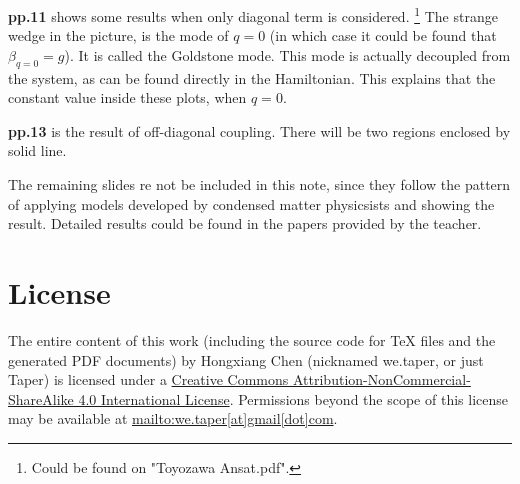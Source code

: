 \documentclass{article}
\numberwithin{equation}{subsection} %
\theoremstyle{definition}
\begin{document}
\textbf{pp.11} shows some results when only diagonal term
is considered.
\footnote{Could be found on "Toyozawa Ansat.pdf".}
The strange wedge
in the picture, is the mode of $q=0$ 
(in which case it could be found that $\beta_{q=0} = g$). 
It is
called the Goldstone mode. This mode is actually decoupled from 
the system, as can be found directly in the Hamiltonian. This explains
that the constant value inside these plots, when $q=0$.

\textbf{pp.13} is the result of off-diagonal coupling. 
There will be two regions enclosed by solid line.

The remaining slides re not be included in this note,
since they follow the pattern of applying models developed
by condensed matter physicsists and showing the result.
Detailed results could be found in the papers provided by
the teacher.
\section{License}
The entire content of this work (including the source code
for TeX files and the generated PDF documents) by 
Hongxiang Chen (nicknamed we.taper, or just Taper) is
licensed under a 
\href{http://creativecommons.org/licenses/by-nc-sa/4.0/}{Creative 
Commons Attribution-NonCommercial-ShareAlike 4.0 International 
License}. Permissions beyond the scope of this 
license may be available at \url{mailto:we.taper[at]gmail[dot]com}.
\end{document}
